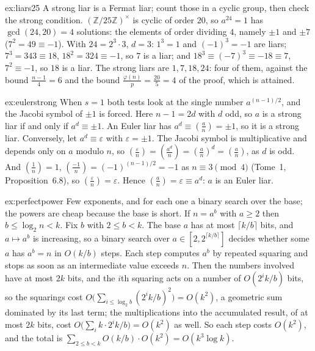 \begin{solution}{ex:liars25}
\idea A strong liar is a Fermat liar; count those in a cyclic group, then check the strong condition.
\writeup $(\mathbb Z/25\mathbb Z)^\times$ is cyclic of order $20$, so $a^{24}=1$ has $\gcd(24,20)=4$ solutions: the elements of order dividing $4$, namely $\pm1$ and $\pm7$ ($7^2=49\equiv-1$). With $24=2^3\cdot3$, $d=3$: $1^3=1$ and $(-1)^3=-1$ are liars; $7^3=343\equiv18$, $18^2=324\equiv-1$, so $7$ is a liar; and $18^3\equiv(-7)^3\equiv-18\equiv7$, $7^2\equiv-1$, so $18$ is a liar. The strong liars are $1,7,18,24$: four of them, against the bound $\frac{n-1}4=6$ and the bound $\frac{\varphi(n)}p=\frac{20}5=4$ of the proof, which is attained.
\end{solution}

\begin{solution}{ex:eulerstrong}
\idea When $s=1$ both tests look at the single number $a^{(n-1)/2}$, and the Jacobi symbol of $\pm1$ is forced.
\writeup Here $n-1=2d$ with $d$ odd, so $a$ is a strong liar if and only if $a^d\equiv\pm1$. An Euler liar has $a^d\equiv\left(\frac an\right)=\pm1$, so it is a strong liar. Conversely, let $a^d\equiv\varepsilon$ with $\varepsilon=\pm1$. The Jacobi symbol is multiplicative and depends only on $a$ modulo $n$, so $\left(\frac\varepsilon n\right)=\left(\frac{a^d}n\right)=\left(\frac an\right)^d=\left(\frac an\right)$, as $d$ is odd.
And $\left(\frac1n\right)=1$, $\left(\frac{-1}n\right)=(-1)^{(n-1)/2}=-1$ as $n\equiv3\pmod4$ (Tome~1, Proposition~6.8), so $\left(\frac\varepsilon n\right)=\varepsilon$. Hence $\left(\frac an\right)=\varepsilon\equiv a^d$: $a$ is an Euler liar.
\end{solution}

\begin{solution}{ex:perfectpower}
\idea Few exponents, and for each one a binary search over the base; the powers are cheap because the base is short.
\writeup If $n=a^b$ with $a\ge2$ then $b\le\log_2n<k$. Fix $b$ with $2\le b<k$. The base $a$ has at most $\lceil k/b\rceil$ bits, and $a\mapsto a^b$ is increasing, so a binary search over $a\in[2,2^{\lceil k/b\rceil}]$ decides whether some $a$ has $a^b=n$ in $O(k/b)$ steps. Each step computes $a^b$ by repeated squaring and stops as soon as an intermediate value exceeds $n$.
Then the numbers involved have at most $2k$ bits, and the $i$th squaring acts on a number of $O(2^ik/b)$ bits, so the squarings cost $O\bigl(\sum_{i\le\log_2b}(2^ik/b)^2\bigr)=O(k^2)$, a geometric sum dominated by its last term; the multiplications into the accumulated result, of at most $2k$ bits, cost $O\bigl(\sum_i k\cdot2^ik/b\bigr)=O(k^2)$ as well. So each step costs $O(k^2)$, and the total is $\sum_{2\le b<k}O(k/b)\cdot O(k^2)=O(k^3\log k)$.
\end{solution}

